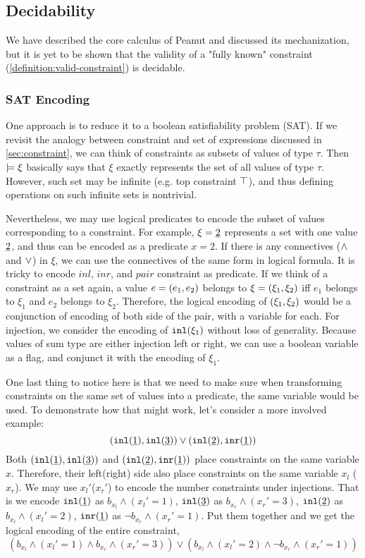 \subsection{Decidability}
\label{sec:decidability}
 We have described the core calculus of Peanut and discussed its mechanization, but it is yet to be shown that the validity of a "fully known" constraint (\autoref{definition:valid-constraint}) is decidable.
\subsubsection{SAT Encoding}
 One approach is to reduce it to a boolean satisfiability problem (SAT). 
If we revisit the analogy between constraint and set of expressions discussed in \autoref{sec:constraint}, we can think of constraints as subsets of values of type $\tau$.
Then $\models \xi$ basically says that $\xi$ exactly represents the set of all values of type $\tau$. 
However, such set may be infinite (e.g. top constraint $\top$),
and thus defining operations on such infinite sets is nontrivial. 

Nevertheless, we may use logical predicates to encode the subset of values corresponding to a constraint. 
For example, $\xi=\underline{2}$ represents a set with one value $\underline{2}$, and thus can be encoded as a predicate $x=2$. 
If there is any connectives ($\wedge$ and $\vee$) in $\xi$, we can use the connectives of the same form in logical formula. 
It is tricky to encode $inl$, $inr$, and $pair$ constraint as predicate. 
If we think of a constraint as a set again, a value $e=(e_1 , e_2)$ belongs to $\xi=(\xi_1 , \xi_2)$ iff $e_1$ belongs to $\xi_1$ and $e_2$ belongs to $\xi_2$. 
Therefore, the logical encoding of $(\xi_1 , \xi_2)$ would be a conjunction of encoding of both side of the pair, with a variable for each.
For injection, we consider the encoding of $\mathtt{inl}(\xi_1)$ without loss of generality. Because values of sum type are either injection left or right, we can use a boolean variable as a flag, and conjunct it with the encoding of $\xi_1$.

One last thing to notice here is that we need to make sure when transforming constraints on the same set of values into a predicate, the same variable would be used. To demonstrate how that might work, let's consider a more involved example:
\[ (\mathtt{inl}(\underline{1}) , \mathtt{inl}(\underline{3})) \vee (\mathtt{inl}(\underline{2}) , \mathtt{inr}(\underline{1})) \]
Both $(\mathtt{inl}(\underline{1}) , \mathtt{inl}(\underline{3}))$ and $(\mathtt{inl}(\underline{2}) , \mathtt{inr}(\underline{1}))$ place constraints on the same variable $x$.
Therefore, their left(right) side also place constraints on the same variable $x_l$ ($x_r$). 
We may use $x_l'$($x_r'$) to encode the number constraints under injections. 
That is we encode $\mathtt{inl}(\underline{1})$ as $b_{x_l} \wedge (x_l'=1)$, 
$\mathtt{inl}(\underline{3})$ as $b_{x_r} \wedge (x_r'=3)$,
$\mathtt{inl}(\underline{2})$ as $b_{x_l} \wedge (x_l'=2)$,
$\mathtt{inr}(\underline{1})$ as $\neg b_{x_r} \wedge (x_r'=1)$. 
Put them together and we get the logical encoding of the entire constraint, 
\[
(b_{x_l} \wedge (x_l'=1) \wedge
b_{x_r} \wedge (x_r'=3))
\vee
(b_{x_l} \wedge (x_l'=2) \wedge
\neg b_{x_r} \wedge (x_r'=1))
\]

